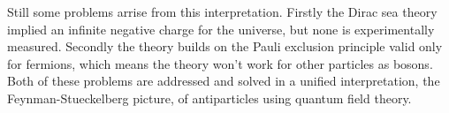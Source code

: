 Still some problems arrise from this interpretation. Firstly the Dirac sea theory implied an infinite negative charge for the universe, but none is experimentally measured. Secondly the theory builds on the Pauli exclusion principle valid only for fermions, which means the theory won't work for other particles as bosons. Both of these problems are addressed and solved in a unified interpretation, the Feynman-Stueckelberg picture, of antiparticles using quantum field theory.
